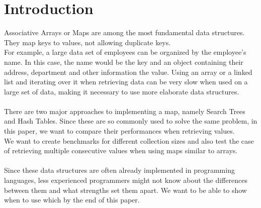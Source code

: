 \section{Introduction}
Associative Arrays or Maps are among the most fundamental data structures. They map keys to values, not allowing duplicate keys.\\
For example, a large data set of employees can be organized by the employee's name. In this case, the name would be the key and an object containing their address, department and other information the value. Using an array or a linked list and iterating over it when retrieving data can be very slow when used on a large set of data, making it necessary to use more elaborate data structures.\\\\
There are two major approaches to implementing a map, namely Search Trees and Hash Tables.
Since these are so commonly used to solve the same problem, in this paper, we want to compare their performances when retrieving values.\\
We want to create benchmarks for different collection sizes and also test the case of retrieving multiple consecutive values when using maps similar to arrays.\\\\
Since these data structures are often already implemented in programming languages, less experienced programmers might not know about the differences between them and what strengths set them apart.
We want to be able to show when to use which by the end of this paper.\\